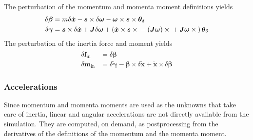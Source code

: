 \documentclass[10pt,dvips,fleqn,subeqn]{report}
\newcommand{\T}[1]{\bm{#1}}
\newcommand{\TT}[1]{\bm{#1}}
\begin{document}
The perturbation of the momentum and momenta moment definitions yields
\begin{subequations}
\label{eq:nodes:delta-beta-gamma}
\begin{align}
	\delta\T{\beta}
	&= m \delta\dot{\T{x}}
	- \T{s}\times\delta\T{\omega}
	- \T{\omega}\times\T{s}\times\T{\theta}_{\delta} \\
	\delta\T{\gamma}
	&=
	\T{s}\times\delta\dot{\T{x}}
	+ \TT{J} \delta\T{\omega}
	+ \plbr{
		\dot{\T{x}}\times\T{s}\times{}
		- \plbr{\TT{J} \T{\omega}}\times{}
		+ \TT{J} \T{\omega}\times{}
	}\T{\theta}_{\delta}
\end{align}
\end{subequations}
The perturbation of the inertia force and moment yields
\begin{subequations}
\begin{align}
	\delta\T{f}_{\text{in}}
	&= \delta\dot{\T{\beta}} \\
	\delta\T{m}_{\text{in}}
	&= \delta\dot{\T{\gamma}}
	- \T{\beta}\times\delta\dot{\T{x}}
	+ \dot{\T{x}}\times\delta\T{\beta}
\end{align}
\end{subequations}

\subsubsection{Accelerations}
\label{sec:nodes:structural nodes:dynamic structural nodes:accelerations}
Since momentum and momenta moments are used as the unknowns
that take care of inertia, linear and angular accelerations
are not directly available from the simulation.
They are computed, on demand, as postprocessing from the derivatives
of the definitions of the momentum and the momenta moment.
\end{document}
